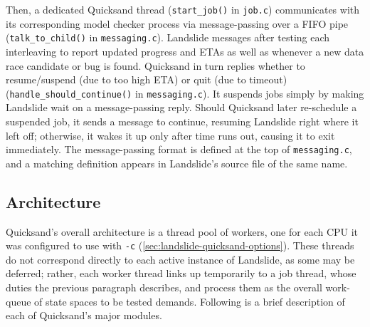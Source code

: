Then, a dedicated Quicksand thread
({\tt start\_job()} in {\tt job.c})
communicates with its corresponding model checker process via message-passing
over a FIFO pipe %
({\tt talk\_to\_\allowbreak{}child()} in {\tt messaging.c}).
Landslide messages after testing each interleaving to report updated progress and ETAs
as well as whenever a new data race candidate or bug is found.
Quicksand in turn replies whether to resume/suspend (due to too high ETA) or quit (due to timeout)
({\tt handle\_should\_continue()} in {\tt messaging.c}).
It suspends jobs simply by making Landslide wait on a message-passing reply.
Should Quicksand later re-schedule a suspended job, it sends a message to continue,
resuming Landslide right where it left off;
otherwise, it wakes it up only after time runs out, causing it to exit immediately.
The message-passing format is defined at the top of {\tt messaging.c},
and a matching definition appears in Landslide's source file of the same name.

\subsection{Architecture}

Quicksand's overall architecture is a thread pool of workers,
one for each CPU it was configured to use with {\tt -c} (\cref{sec:landslide-quicksand-options}).
These threads do not correspond directly to each active instance of Landslide,
as some may be deferred;
rather, each worker thread links up temporarily to a job thread, whose duties the previous paragraph describes,
and process them as the overall work-queue of state spaces to be tested demands.
Following is a brief description of each of Quicksand's major modules.

